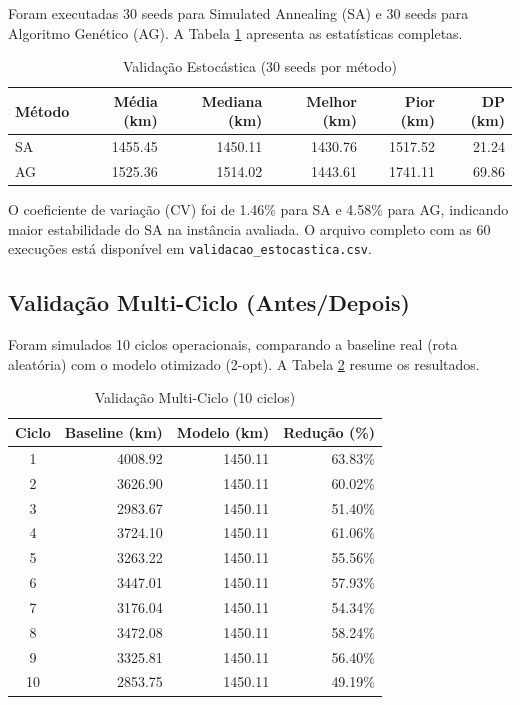 \documentclass[11pt,a4paper,twocolumn]{article}
\begin{document}
Foram executadas 30 seeds para Simulated Annealing (SA) e 30 seeds para Algoritmo Genético (AG). A Tabela \ref{tab:validacao_estocastica} apresenta as estatísticas completas.

\begin{table}[H]
\centering
\caption{Validação Estocástica (30 seeds por método)}
\label{tab:validacao_estocastica}
\begin{tabular}{|l|r|r|r|r|r|}
\hline
\textbf{Método} & \textbf{Média (km)} & \textbf{Mediana (km)} & \textbf{Melhor (km)} & \textbf{Pior (km)} & \textbf{DP (km)} \\
\hline
SA & 1455.45 & 1450.11 & 1430.76 & 1517.52 & 21.24 \\
AG & 1525.36 & 1514.02 & 1443.61 & 1741.11 & 69.86 \\
\hline
\end{tabular}
\end{table}

O coeficiente de variação (CV) foi de 1.46\% para SA e 4.58\% para AG, indicando maior estabilidade do SA na instância avaliada. O arquivo completo com as 60 execuções está disponível em \texttt{validacao\_estocastica.csv}.

\subsection{Validação Multi-Ciclo (Antes/Depois)}

Foram simulados 10 ciclos operacionais, comparando a baseline real (rota aleatória) com o modelo otimizado (2-opt). A Tabela \ref{tab:validacao_campo} resume os resultados.

\begin{table}[H]
\centering
\caption{Validação Multi-Ciclo (10 ciclos)}
\label{tab:validacao_campo}
\begin{tabular}{|c|r|r|r|}
\hline
\textbf{Ciclo} & \textbf{Baseline (km)} & \textbf{Modelo (km)} & \textbf{Redução (\%)} \\
\hline
1 & 4008.92 & 1450.11 & 63.83\% \\
2 & 3626.90 & 1450.11 & 60.02\% \\
3 & 2983.67 & 1450.11 & 51.40\% \\
4 & 3724.10 & 1450.11 & 61.06\% \\
5 & 3263.22 & 1450.11 & 55.56\% \\
6 & 3447.01 & 1450.11 & 57.93\% \\
7 & 3176.04 & 1450.11 & 54.34\% \\
8 & 3472.08 & 1450.11 & 58.24\% \\
9 & 3325.81 & 1450.11 & 56.40\% \\
10 & 2853.75 & 1450.11 & 49.19\% \\
\hline
\end{tabular}
\end{table}
\end{document}
